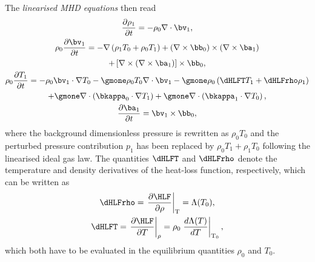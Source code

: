 The \emph{linearised MHD equations} then read
\begin{gather}
  \frac{\partial \rho_1}{\partial t} = -\rho_0 \nabla \cdot \bv_1, \label{eq: linearised_rho1_homo}\\
  \rho_0 \frac{\partial \bv_1}{\partial t} =
    -\nabla\left(\rho_1 T_0 + \rho_0 T_1\right)
    +\left(\nabla \times \bb_0\right) \times \left(\nabla \times \ba_1\right) \nonumber \\
    +\left[\nabla \times \left(\nabla \times \ba_1\right)\right] \times \bb_0, \\
  \rho_0\frac{\partial T_1}{\partial t} =
    -\rho_0\bv_1 \cdot \nabla T_0
    -\gmone \rho_0 T_0 \nabla \cdot \bv_1
    -\gmone \rho_0 \left(\dHLFT T_1 + \dHLFrho \rho_1\right) \nonumber \\
    +\gmone \nabla \cdot \left(\bkappa_0 \cdot \nabla T_1\right)
    +\gmone \nabla \cdot \left(\bkappa_1 \cdot \nabla T_0\right), \\
  \frac{\partial \ba_1}{\partial t} = \bv_1 \times \bb_0, \label{eq: linearised_A1_homo}
\end{gather}
where the background dimensionless pressure is rewritten as $\rho_0 T_0$ and the perturbed pressure contribution $p_1$ has been replaced by $\rho_0 T_1 + \rho_1 T_0$ following the linearised ideal gas law. The quantities $\dHLFT$ and $\dHLFrho$ denote the temperature and density derivatives of the heat-loss function, respectively, which can be written as
\begin{equation} \label{eq: dHLF_homogeneous}
  \begin{gathered}
    \dHLFrho = \left.\frac{\partial \HLF}{\partial \rho}\right|_\text{T} = \Lambda(T_0), \\
    \dHLFT = \left.\frac{\partial \HLF}{\partial T}\right|_\rho =
      \rho_0 \left.\frac{d\Lambda(T)}{dT}\right|_{\text{T}_0},
  \end{gathered}
\end{equation}
which both have to be evaluated in the equilibrium quantities $\rho_0$ and $T_0$.

